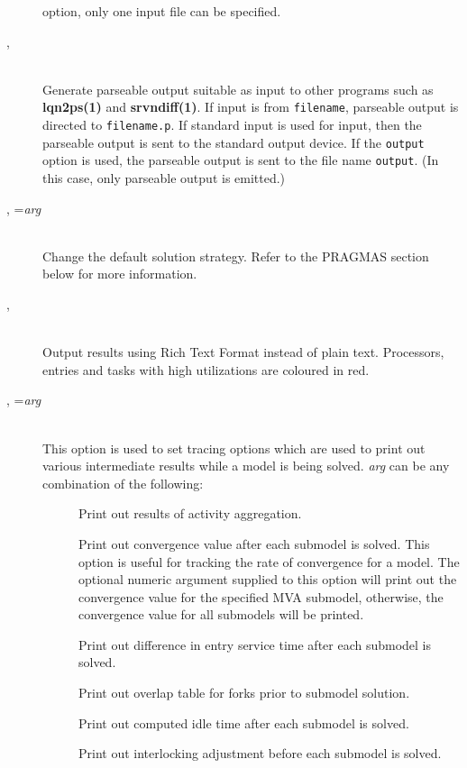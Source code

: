 \begin{description}
option, only one input file can be specified.
\item[\flag{p}{}, \longopt{parseable}]~\\
Generate parseable output suitable as input to other programs such as
\textbf{lqn2ps(1)} and \textbf{srvndiff(1)}.  If input is from
\texttt{filename}, parseable output is directed to \texttt{filename.p}.
If standard input is used for input, then the parseable output is sent
to the standard output device.  If the \texttt{output} option is used, the
parseable output is sent to the file name \texttt{output}.
(In this case, only parseable output is emitted.)
\item[\flag{P}{}, \longopt{pragma}=\emph{arg}]~\\
Change the default solution strategy.  Refer to the PRAGMAS section
below for more information.
\item[\flag{r}{}, \longopt{rtf}]~\\
Output results using Rich Text Format instead of plain text.  Processors, entries and tasks with high utilizations are coloured in red.
\item[\flag{t}{}, \longopt{trace}=\emph{arg}]~\\
This option is used to set tracing  options which are used to print out various
intermediate results  while a model is being solved.
\emph{arg} can be any combination of the following:
\begin{description}
\item[]
Print out results of activity aggregation.
\item[]
Print out convergence value after each submodel is solved.
This option is useful for tracking the rate of convergence for a model.
The optional numeric argument supplied to this option will print out the convergence value for the specified MVA submodel, otherwise,
the convergence value for all submodels will be printed.
\item[]
Print out difference in entry service time after each submodel is solved.
\item[]
Print out overlap table for forks prior to submodel solution.
\item[]
Print out computed idle time after each submodel is solved.
\item[]
Print out interlocking adjustment before each submodel is solved.
\item[]

\end{description}
\end{description}
